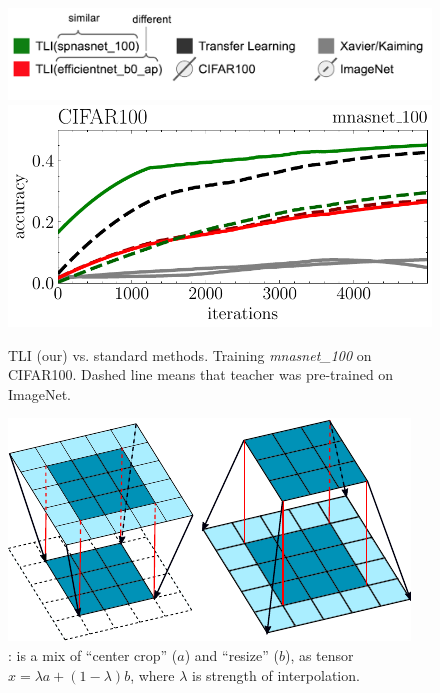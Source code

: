 \documentclass{article} %
\begin{document}
\vspace{-2mm}

\begin{figure}
    \vspace{-11mm}
    \center\includegraphics[width=\linewidth]{figures/v1_legend}
	\vspace{-7mm}
	\center\includegraphics[width=\linewidth]{figures/v1_abstract_CIFAR100__acc_train}
    \vskip -5pt
	\caption{TLI (our) vs. standard methods. Training \textit{mnasnet\_100} on
	CIFAR100. Dashed line means that teacher was pre-trained on ImageNet.}
    \label{fig:tli_figure}
    \vspace{2mm}
    \center\includegraphics[width=\linewidth]{figures/v1_ComboInjection}
    \vskip -5pt
	\caption{\ComboInjection: is a mix of ``center crop'' ($a$) and
	``resize'' ($b$), as tensor $x=\lambda a + (1 - \lambda)b$,
	where $\lambda$ is strength of interpolation.}
    \label{fig:da_figure}
	\vspace{-15mm}
\end{figure}
\end{document}
